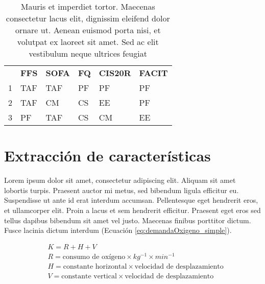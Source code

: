 \begin{table}
\footnotesize
\centering
\caption{Mauris et imperdiet     tortor. Maecenas consectetur lacus elit, dignissim eleifend dolor  ornare ut. Aenean euismod porta nisi, et volutpat ex laoreet sit amet. Sed ac elit vestibulum neque ultrices feugiat}
\label{tab:recopilacionDeCuestionarios}
\begin{tabular}{m{0.2cm}m{2.5cm}m{2.5cm}m{2.5cm}m{2.5cm}m{2.5cm}}
\hline\noalign{\smallskip}
 & \textbf{FFS} & \textbf{SOFA} & \textbf{FQ} & \textbf{CIS20R} & \textbf{FACIT}
\\ \noalign{\smallskip}
\hline
\noalign{\smallskip}
1	&	TAF	&	TAF	&	PF	&	PF	&	PF\\
2	&	TAF	&	CM	&	CS	&	EE	&	PF\\
3	&	PF	&	TAF	&	CS	&	CM	&	EE\\
\hline
\end{tabular}
\end{table}



\section{Extracci\'on de caracter\'isticas}\label{secc:pruebasFisicas}
Lorem ipsum dolor sit amet, consectetur adipiscing elit. Aliquam sit amet lobortis turpis. Praesent auctor mi metus, sed bibendum ligula efficitur eu. Suspendisse ut ante id erat interdum accumsan. Pellentesque eget hendrerit eros, et ullamcorper elit. Proin a lacus et sem hendrerit efficitur. Praesent eget eros sed tellus dapibus bibendum sit amet vel justo. Maecenas finibus porttitor dictum. Fusce lacinia dictum interdum (Ecuación \ref{eq:demandaOxigeno_simple}).


\begin{equation} \label{eq:demandaOxigeno_simple}
\begin{split} 
& K = R + H + V \\ 
& R = \textrm{consumo de oxígeno} \times kg^{-1} \times min^{-1}\\ 
& H = \textrm{constante horizontal} \times \textrm{velocidad de desplazamiento}\\ 
& V = \textrm{constante vertical} \times \textrm{velocidad de desplazamiento}\\ 
\end{split} 
\end{equation} 

